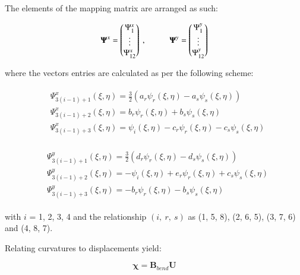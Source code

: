 The elements of the mapping matrix are arranged as such:

\begin{equation} 
\mathbf{\Psi}^x = 
\begin{pmatrix}
\Psi_1^x \\
\vdots \\
\Psi_{12}^x
\end{pmatrix}\ ,
\hspace{10mm}
\mathbf{\Psi}^y = 
\begin{pmatrix}
\Psi_1^y \\
\vdots \\
\Psi_{12}^y
\end{pmatrix}
\label{equation24}
\end{equation}

where the vectors entries are calculated as per the following scheme:

\begin{gather} 
	\begin{aligned}
		&\Psi_{3(i-1)+1}^x (\xi , \eta) = \frac{3}{2} (a_r \psi_r (\xi , \eta) - a_s \psi_s (\xi , \eta) ) \\
		&\Psi_{3(i-1)+2}^x (\xi , \eta) = b_r \psi_r (\xi , \eta) + b_s \psi_s (\xi , \eta) \\
		&\Psi_{3(i-1)+3}^x (\xi , \eta) = \psi_i (\xi , \eta) - c_r \psi_r (\xi , \eta) - c_s \psi_s (\xi , \eta)
		\label{equation25}
	\end{aligned}
\end{gather}

\begin{gather} 
	\begin{aligned}
		&\Psi_{3(i-1)+1}^y (\xi , \eta) = \frac{3}{2} (d_r \psi_r (\xi , \eta) - d_s \psi_s (\xi , \eta) ) \\
		&\Psi_{3(i-1)+2}^y (\xi , \eta) = -\psi_i (\xi , \eta) + e_r \psi_r (\xi , \eta) + c_s \psi_s (\xi , \eta) \\
		&\Psi_{3(i-1)+3}^y (\xi , \eta) = -b_r \psi_r (\xi , \eta) - b_s \psi_s (\xi , \eta)
		\label{equation26}
	\end{aligned}
\end{gather}

with $i$ = 1, 2, 3, 4 and the relationship $(i,\ r,\ s)$ as (1, 5, 8), (2, 6, 5), (3, 7, 6) and (4, 8, 7).

Relating curvatures to displacements yield:

\begin{equation} 
\boldsymbol{\chi} = \mathbf{B}_{bend} \mathbf{U}
\label{equation27}
\end{equation}


